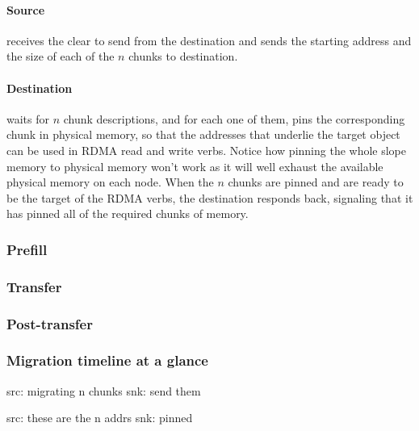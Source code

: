 \paragraph{Source}
receives the clear to send from the destination and sends the starting address
and the size of each of the $n$ chunks to destination.

\paragraph{Destination}
waits for $n$ chunk descriptions, and for each one of them, pins the
corresponding chunk in physical memory, so that the addresses that underlie the
target object can be used in RDMA read and write verbs. Notice how pinning the
whole slope memory to physical memory won't work as it will well exhaust the
available physical memory on each node. When the $n$ chunks are pinned
and are ready to be the target of the RDMA verbs, the destination responds back,
signaling that it has pinned all of the required chunks of memory.

\subsubsection{Prefill}

\subsubsection{Transfer}

\subsubsection{Post-transfer}

\subsubsection{Migration timeline at a glance}



src: migrating n chunks
snk: send them

src: these are the n addrs
snk: pinned

